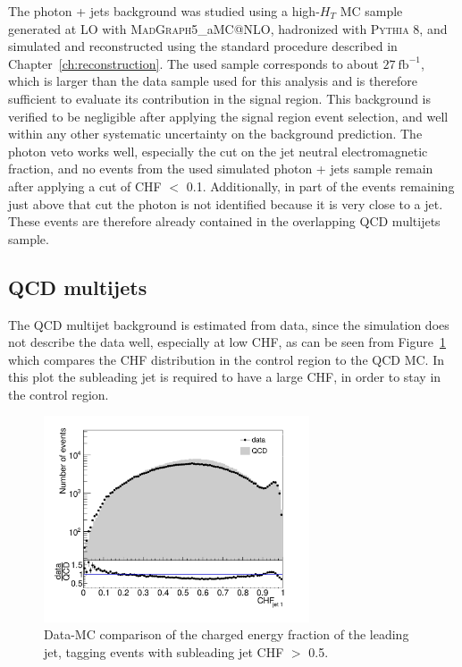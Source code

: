 The photon + jets background was studied using a high-$H_T$ MC sample generated at \ac{LO} with \textsc{MadGraph5\_}a\textsc{MC@NLO}, hadronized with \textsc{Pythia 8}, and simulated and reconstructed using the standard procedure described in Chapter~\ref{ch:reconstruction}. The used sample corresponds to about $27\ \mathrm{fb}^{-1}$, which is larger than the data sample used for this analysis and is therefore sufficient to evaluate its contribution in the signal region. This background is verified to be negligible after applying the signal region event selection, and well within any other systematic uncertainty on the background prediction. The photon veto works well, especially the cut on the jet neutral electromagnetic fraction, and no events from the used simulated photon + jets sample remain after applying a cut of CHF $<$ 0.1. Additionally, in part of the events remaining just above that cut the photon is not identified because it is very close to a jet. These events are therefore already contained in the overlapping \acs{QCD} multijets sample.

\subsection{QCD multijets}

The \acs{QCD} multijet background is estimated from data, since the simulation does not describe the data well, especially at low CHF, as can be seen from Figure~\ref{fig:dataMC} which compares the CHF distribution in the control region to the \acs{QCD} MC. In this plot the subleading jet is required to have a large CHF, in order to stay in the control region.

\begin{figure}[ht]
  \centering
  \includegraphics[width=0.7\textwidth]{figures/bkgd_estimation_dataMC.pdf}\hfill%
  \caption{Data-MC comparison of the charged energy fraction of the leading jet, tagging events with subleading jet CHF $>$ 0.5.}
  \label{fig:dataMC}
\end{figure}

